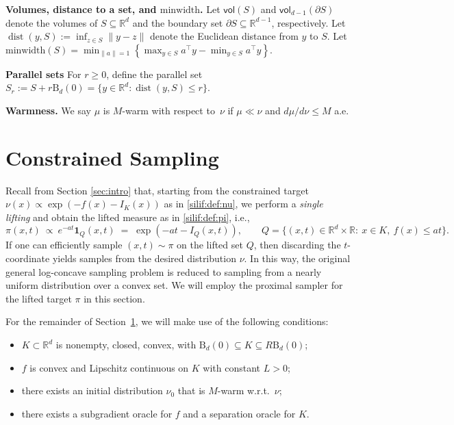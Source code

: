 \documentclass[11pt,letterpaper]{article}
\newcommand{\ball}{\mathrm{B}}
\newcommand{\R}{\mathbb{R}}
\newcommand{\norm}[1]{\left\lVert #1 \right\rVert}
\newcommand{\dist}{\operatorname{dist}}
\newcommand{\vol}{\mathsf{vol}}
\begin{document}
\textbf{Volumes, distance to a set, and $\mbox{minwidth}$.} Let $\vol(S)$ and $\vol_{d-1}(\partial S)$ denote the volumes of $S\subseteq \R^d$ and the boundary set $\partial S \subseteq \R^{d-1}$, respectively. Let $\dist (y,S):=\inf_{z\in S}\|y-z\|$ denote the Euclidean distance from $y$ to $S$. Let $\mbox{minwidth}(S)=\min_{\norm{a}=1}\left\{\max_{y\in S}a^\top y-\min_{y\in S}a^\top y\right\}$.

\textbf{Parallel sets} For $r\ge 0$, define the parallel set $S_r := S + r \ball_d(0) = \{y\in \R^d:\dist (y,S)\le r\}$. 

\textbf{Warmness.} We say $\mu$ is $M$-warm with respect to\ $\nu$ if $\mu\ll\nu$ and $d\mu/d\nu\le M$ a.e.


\section{Constrained Sampling}
\label{sec:constrained:mainpaper}
Recall from Section \ref{sec:intro} that, starting from the constrained target $\nu(x)\propto \exp\!\left(-f(x)-I_K(x)\right)$ as in \eqref{silif:def:nu}, we perform a \emph{single lifting} and obtain the lifted measure as in \eqref{silif:def:pi}, i.e.,
\[
\pi(x,t)\ \propto\ e^{-at} \mathbf{1}_Q(x,t)\;=\;\exp\!\left(-at-I_Q(x,t)\right),
\qquad 
Q=\{(x,t)\in\R^d\times\R:\ x\in K,\ f(x)\le at\}.
\]
If one can efficiently sample $(x,t)\sim\pi$ on the lifted set $Q$, then discarding the $t$-coordinate yields samples from the desired distribution $\nu$. In this way, the original general log-concave sampling problem is reduced to sampling from a nearly uniform distribution over a convex set. We will employ the proximal sampler for the lifted target $\pi$ in this section.




For the remainder of Section~\ref{sec:constrained:mainpaper}, we will make use of the following conditions:
\begin{itemize}
\item[(A1)] $K\subset \mathbb{R}^d$ is nonempty, closed, convex, with $\ball_d(0)\subseteq K\subseteq R \ball_d(0)$;
\item[(A2)] $f$ is convex and Lipschitz continuous on $K$ with constant $L>0$;
\item[(A3)] there exists an initial distribution $\nu_0$ that is $M$-warm w.r.t.\ $\nu$;
\item[(A4)] there exists a subgradient oracle for $f$ and a separation oracle for $K$. 
\end{itemize} 
\end{document}
